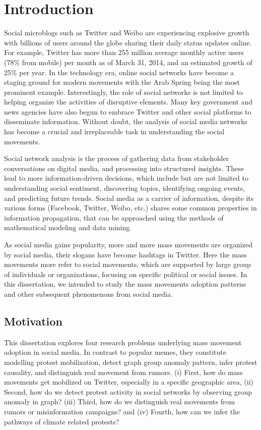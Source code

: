 \chapter{Introduction}
Social microblogs such as Twitter and Weibo are experiencing explosive growth with billions of users around the globe sharing their daily status updates online. For example, Twitter has more than 255 million average monthly active users (78\% from mobile) per month as of March 31, 2014, and an estimated growth of 25\% per year. In the technology era, online social networks have become a staging ground for modern movements with the Arab Spring being the most prominent example. Interestingly, the role of social networks is not limited to helping organize the activities of disruptive elements. Many key government and news agencies have also begun to embrace Twitter and other social platforms to disseminate information. Without doubt, the analysis of social media networks has become a crucial and irreplaceable task in understanding the social movements.

Social network analysis is the process of gathering data from stakeholder conversations on digital media, and processing into structured insights. These lead to more information-driven decisions, which include but are not limited to understanding social sentiment, discovering topics, identifying ongoing events, and predicting future trends. Social media as a carrier of information, despite its various forms (Facebook, Twitter, Weibo, etc.)
shares some common properties in information propagation, that can be approached
using the methods of mathematical modeling and data mining.

As social media gains popularity, more and more mass movements are organized by social media, their slogans have become hashtags in Twitter. Here the mass movements more refer to social movements, which are supported by large group of individuals or organizations, focusing on specific political or social issues. In this dissertation, we intended to study the mass movements adoption patterns and other subsequent phenomenons from social media. 






\section{Motivation}
 This dissertation explores four research problems underlying mass movement adoption in social media. In contrast to popular memes, they constitute modelling protest mobilization, detect graph group anomaly pattern, infer protest causality, and distinguish real movement from rumors.
(i) First, how do mass movements get mobilized on Twitter, especially in a specific geographic area,
(ii) Second, how do we detect protest activity in social networks by observing group anomaly in graph?
(iii) Third, how do we distinguish real movements from rumors or misinformation campaigns?
and (iv) Fourth, how can we infer the pathways of climate related protests?
\\

